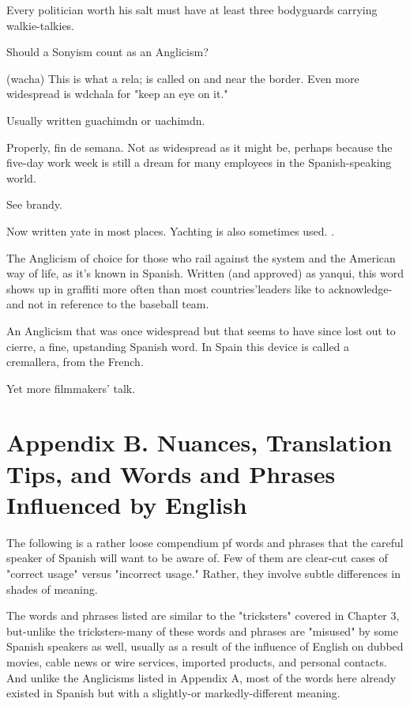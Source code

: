  Every politician worth his salt must have at
least three bodyguards carrying walkie-talkies.

 Should a Sonyism count as an Anglicism?

 (wacha) This is what a rela; is called on and near the
border. Even more widespread is wdchala for "keep an eye on it."

 Usually written guachimdn or uachimdn.

 Properly, fin de semana. Not as widespread as it
might be, perhaps because the five-day work week is still a dream for
many employees in the Spanish-speaking world.

 See brandy.

 Now written yate in most places. Yachting is also
sometimes used. .

 The Anglicism of choice for those who rail against
the system and the American way of life, as it's known in Spanish.
Written (and approved) as yanqui, this word shows up in graffiti more
often than most countries'leaders like to acknowledge-and not in
reference to the baseball team.

 An Anglicism that was once widespread but that
seems to have since lost out to cierre, a fine, upstanding Spanish
word. In Spain this device is called a cremallera, from the French.

 Yet more filmmakers' talk.

\chapter{Appendix B. Nuances, Translation Tips, and Words and Phrases Influenced by English}

The following is a rather loose compendium pf words and
phrases that the careful speaker of Spanish will want to be aware of.
Few of them are clear-cut cases of "correct usage" versus "incorrect usage." Rather, they involve subtle differences in shades of meaning.

The words and phrases listed are similar to the "tricksters"
covered in Chapter 3, but-unlike the tricksters-many of these words
and phrases are "misused" by some Spanish speakers as well, usually
as a result of the influence of English on dubbed movies, cable news
or wire services, imported products, and personal contacts. And unlike the Anglicisms listed in Appendix A, most of the words here already
existed in Spanish but with a slightly-or markedly-different meaning.

